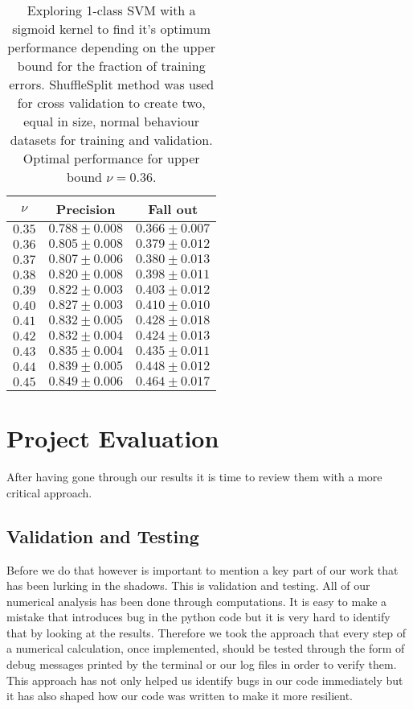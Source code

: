 \documentclass[reqno,openany,12pt]{amsbook}
\begin{document}
\begin{table}
\begin{tabular}{|c|c|c|}
\hline
$\nu$ &  Precision & Fall out \\ \hline 
$0.35$ &  $0.788 \pm 0.008$ & $0.366 \pm 0.007$ \\ \hline 
$0.36$ &  $0.805 \pm 0.008$ & $0.379 \pm 0.012$ \\ \hline 
$0.37$ &  $0.807 \pm 0.006$ & $0.380 \pm 0.013$ \\ \hline 
$0.38$ &  $0.820 \pm 0.008$ & $0.398 \pm 0.011$ \\ \hline 
$0.39$ &  $0.822 \pm 0.003$ & $0.403 \pm 0.012$ \\ \hline 
$0.40$ &  $0.827 \pm 0.003$ & $0.410 \pm 0.010$ \\ \hline 
$0.41$ &  $0.832 \pm 0.005$ & $0.428 \pm 0.018$ \\ \hline 
$0.42$ &  $0.832 \pm 0.004$ & $0.424 \pm 0.013$ \\ \hline 
$0.43$ &  $0.835 \pm 0.004$ & $0.435 \pm 0.011$ \\ \hline
$0.44$ &  $0.839 \pm 0.005$ & $0.448 \pm 0.012$ \\ \hline
$0.45$ &  $0.849 \pm 0.006$ & $0.464 \pm 0.017$ \\ \hline
\end{tabular}
\vspace{5pt}
\caption[Finding optimum 1-class SVM performance depending on bound for training errors]{Exploring 1-class SVM with a sigmoid kernel to find it's optimum performance depending on the upper bound for the fraction of training errors. ShuffleSplit method was used for cross validation to create two, equal in size, normal behaviour datasets for training and validation. Optimal performance for upper bound $\nu = 0.36$.}
\label{1csvmt4}
\end{table}


%

\chapter{Project Evaluation}

After having gone through our results it is time to review them with a more critical approach. 

\section{Validation and Testing} 

Before we do that however is important to mention a key part of our work that has been lurking in the shadows. This is validation and testing. All of our numerical analysis has been done through computations. It is easy to make a mistake that introduces bug in the python code but it is very hard to identify that by looking at the results. Therefore we took the approach that every step of a numerical calculation, once implemented, should be tested through the form of debug messages printed by the terminal or our log files in order to verify them. This approach has not only helped us identify bugs in our code immediately but it has also shaped how our code was written to make it more resilient.
\end{document}
